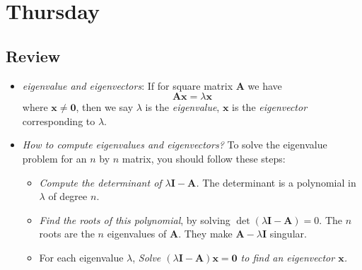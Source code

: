 

\section{Thursday}
\subsection{Review}
\begin{itemize}
\item
\emph{eigenvalue and eigenvectors}:
If for square matrix $\bm A$ we have
\[
\bm{Ax}=\lambda\bm x
\]
where $\bm x\ne\bm 0$, then we say $\lambda$ is the \textit{eigenvalue}, $\bm x$ is the \textit{eigenvector} corresponding to $\lambda$.
\item
\emph{How to compute eigenvalues and eigenvectors?}
To solve the eigenvalue problem for an $n$ by $n$ matrix, you should follow these steps:
\begin{itemize}
\item
\textit{Compute the determinant of $\lambda\bm I-\bm A$.} The determinant is a polynomial in $\lambda$ of degree $n$.
\item
\textit{Find the roots of this polynomial}, by solving $\det(\lambda\bm I-\bm A)=0$. The $n$ roots are the $n$ eigenvalues of $\bm A$. They make $\bm A-\lambda\bm I$ singular.
\item
For each eigenvalue $\lambda$, \textit{Solve $(\lambda\bm I-\bm A)\bm x=\bm 0$ to find an eigenvector $\bm x$.}
\end{itemize}
\end{itemize}
